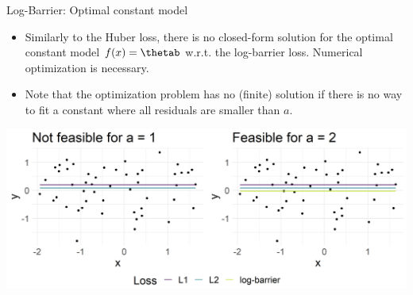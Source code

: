 \begin{vbframe}{Log-Barrier: Optimal constant model}

\begin{itemize}
 \item Similarly to the Huber loss, there is no closed-form solution for the optimal constant model $\fx = \thetab$ w.r.t. the log-barrier loss. Numerical optimization is necessary.
 \item Note that the optimization problem has no (finite) solution if there is no way to fit a constant where all residuals are smaller than $a$.  
\end{itemize}

\vspace{0.2cm}

\begin{center}
\includegraphics[width = \textwidth]{figure/loss_logbarrier_2.png}
\end{center}

% 
% 
% 
% 
% 


\end{vbframe}

